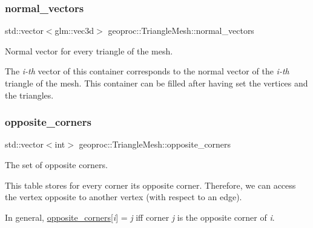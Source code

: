 \subsubsection{\texorpdfstring{normal\+\_\+vectors}{normal\_vectors}}
{\footnotesize\ttfamily std\+::vector$<$glm\+::vec3d$>$ geoproc\+::\+Triangle\+Mesh\+::normal\+\_\+vectors\hspace{0.3cm}{\ttfamily [protected]}}



Normal vector for every triangle of the mesh. 

The {\itshape i-\/th} vector of this container corresponds to the normal vector of the {\itshape i-\/th} triangle of the mesh. This container can be filled after having set the vertices and the triangles. \mbox{\label{classgeoproc_1_1TriangleMesh_a2604795c90c694116513252b86d242b4}} 
\subsubsection{\texorpdfstring{opposite\+\_\+corners}{opposite\_corners}}
{\footnotesize\ttfamily std\+::vector$<$int$>$ geoproc\+::\+Triangle\+Mesh\+::opposite\+\_\+corners\hspace{0.3cm}{\ttfamily [protected]}}



The set of opposite corners. 

This table stores for every corner its opposite corner. Therefore, we can access the vertex opposite to another vertex (with respect to an edge).

In general, \hyperlink{classgeoproc_1_1TriangleMesh_a2604795c90c694116513252b86d242b4}{opposite\+\_\+corners}\mbox{[}{\itshape i}\mbox{]} = {\itshape j} iff corner {\itshape j} is the opposite corner of {\itshape i}.


